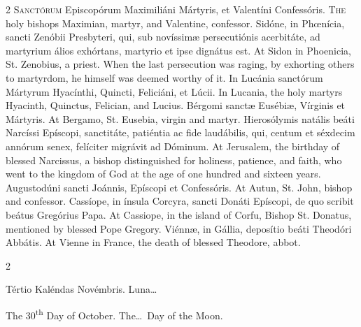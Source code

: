 \begin{paracol}{2}
\lettrine[lines=2]{S}{anctórum} Episcopórum 
 Maximiliáni Mártyris, et Valentíni Confessóris.
\switchcolumn
{}
\lettrine[lines=2]{T}{he} holy bishops Maximian, martyr, and Valentine,
	confessor.
\switchcolumn*
{}
Sidóne, in Phœnícia, 
 sancti Zenóbii Presbyteri, qui, sub novíssimæ persecutiónis acerbitáte, ad 
 martyrium álios exhórtans, martyrio et ipse dignátus est.
\switchcolumn
{}
At Sidon in Phoenicia, St. Zenobius, 
 a priest. When the last persecution was raging, by exhorting others to 
 martyrdom, he himself was deemed worthy of it.
\switchcolumn*
{}
In Lucánia sanctórum 
 Mártyrum Hyacínthi, Quincti, Feliciáni, et Lúcii.
\switchcolumn
{}
In Lucania, the holy martyrs 
 Hyacinth, Quinctus, Felician, and Lucius.
\switchcolumn*
{}
Bérgomi sanctæ Eusébiæ, 
 Vírginis et Mártyris.
\switchcolumn
{}
At Bergamo, St. Eusebia, virgin and 
 martyr.
\switchcolumn*
{}
Hierosólymis natális 
 beáti Narcíssi Epíscopi, sanctitáte, patiéntia ac fide laudábilis, qui, 
 centum et séxdecim annórum senex, felíciter migrávit ad Dóminum.
\switchcolumn
{}
At Jerusalem, the birthday of 
 blessed Narcissus, a bishop distinguished for holiness, patience, and faith, 
 who went to the kingdom of God at the age of one hundred and sixteen years.
\switchcolumn*
{}
Augustodúni sancti 
 Joánnis, Epíscopi et Confessóris.
\switchcolumn
{}
At Autun, St. John, bishop and 
 confessor.
\switchcolumn*
{}
Cassíope, in ínsula 
 Corcyra, sancti Donáti Epíscopi, de quo scribit beátus Gregórius Papa.
\switchcolumn
{}
At Cassiope, in the island of Corfu, 
 Bishop St. Donatus, mentioned by blessed Pope Gregory.
\switchcolumn*
{}
Viénnæ, in Gállia, 
 deposítio beáti Theodóri Abbátis.
\switchcolumn
{}
At Vienne in France, the death of 
 blessed Theodore, abbot.
\switchcolumn*
{}
\end{paracol}


\begin{paracol}{2}
\begin{center}{\color{gregoriocolor} Tértio Kaléndas Novémbris. 
 Luna\dots\ }\end{center}
\switchcolumn
{}
\begin{center}{\color{gregoriocolor} The 
 30\textsuperscript{th} Day of 
 October. The\dots\ Day of the Moon.}\end{center}
\end{paracol}

